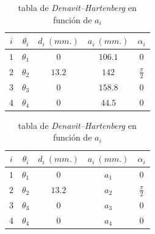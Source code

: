 \documentclass[a4paper,12pt]{article}
\begin{document}
\begin{table}[H]
    \parbox{.45\linewidth}{
        \centering
        \begin{tabular}{ c | c c c c }
            $i$ & $\theta_i$ & $d_i~(mm.)$ & $a_i~(mm.)$ & $\alpha_i$ \\ [0.5ex]
            \hline
            $1$ & $\theta_1$ & $0$ & $106.1$ & $0$ \\
            $2$ & $\theta_2$ & $13.2$ & $142$ & $\frac{\pi}{2}$ \\
            $3$ & $\theta_3$ & $0$ & $158.8$ & $0$ \\
            $4$ & $\theta_4$ & $0$ & $44.5$ & $0$ \\ [1ex]
        \end{tabular}
        \caption{tabla de \textit{Denavit–Hartenberg}}
    }
    \hfill
    \parbox{.45\linewidth}{
        \centering
        \begin{tabular}{ c | c c c c }
            $i$ & $\theta_i$ & $d_i~(mm.)$ & $a_i~(mm.)$ & $\alpha_i$ \\ [0.5ex]
            \hline
            $1$ & $\theta_1$ & $0$ & $a_1$ & $0$ \\
            $2$ & $\theta_2$ & $13.2$ & $a_2$ & $\frac{\pi}{2}$ \\
            $3$ & $\theta_3$ & $0$ & $a_3$ & $0$ \\
            $4$ & $\theta_4$ & $0$ & $a_4$ & $0$ \\ [1ex]
        \end{tabular}
        \caption{tabla de \textit{Denavit–Hartenberg} en función de $a_i$}
    }
\end{table}

\newpage
\printbibliography
\end{document}
